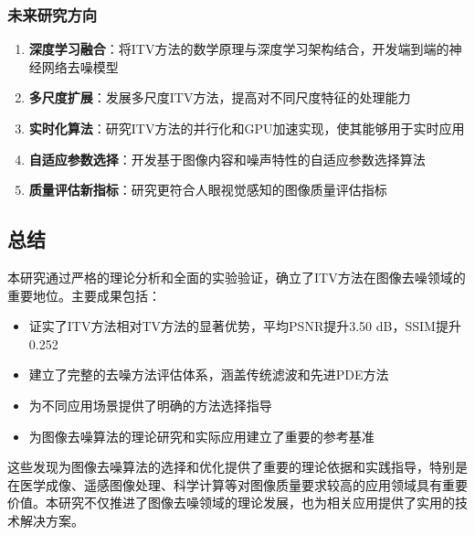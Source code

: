 \documentclass[a4paper,12pt]{ctexart}
\begin{document}
\subsubsection{未来研究方向}

\begin{enumerate}
    \item \textbf{深度学习融合}：将ITV方法的数学原理与深度学习架构结合，开发端到端的神经网络去噪模型

    \item \textbf{多尺度扩展}：发展多尺度ITV方法，提高对不同尺度特征的处理能力

    \item \textbf{实时化算法}：研究ITV方法的并行化和GPU加速实现，使其能够用于实时应用

    \item \textbf{自适应参数选择}：开发基于图像内容和噪声特性的自适应参数选择算法

    \item \textbf{质量评估新指标}：研究更符合人眼视觉感知的图像质量评估指标
\end{enumerate}

\subsection{总结}

本研究通过严格的理论分析和全面的实验验证，确立了ITV方法在图像去噪领域的重要地位。主要成果包括：

\begin{itemize}
    \item 证实了ITV方法相对TV方法的显著优势，平均PSNR提升3.50 dB，SSIM提升0.252
    \item 建立了完整的去噪方法评估体系，涵盖传统滤波和先进PDE方法
    \item 为不同应用场景提供了明确的方法选择指导
    \item 为图像去噪算法的理论研究和实际应用建立了重要的参考基准
\end{itemize}

这些发现为图像去噪算法的选择和优化提供了重要的理论依据和实践指导，特别是在医学成像、遥感图像处理、科学计算等对图像质量要求较高的应用领域具有重要价值。本研究不仅推进了图像去噪领域的理论发展，也为相关应用提供了实用的技术解决方案。
\end{document}
